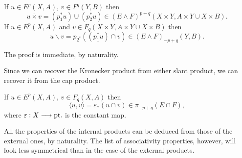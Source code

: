 \documentclass[../main]{subfiles}
\begin{document}
\begin{proposition}\label{prop:p3ch09.13}
If $u \in E^p(X, A)$, $v \in F^q(Y, B)$ then $$u \overline \times v = (p_1^\ast u) \cup (p_2^\ast u) \in (E \wedge F)^{p + q}(X \times Y, A \times Y \cup X \times B).$$ If $u \in E^p(X, A)$ and $v \in F_q(X \times Y, A \times Y \cup X \times B)$ then $$u \backslash v = p_{2^\ast} ((p_1^\ast u) \cap v) \in (E \wedge F)_{-p + q}(Y, B).$$ 
\end{proposition}

The proof is immediate, by naturality. 

Since we can recover the Kronecker product from either slant product, we can recover it from the cap product. 

\begin{proposition}\label{prop:p3ch09.14}
If $u \in E^p(X, A)$, $v \in F_q(X, A)$ then $$\langle u, v\rangle = \varepsilon_\ast (u \cap v) \in \pi_{-p + q}(E \cap F),$$ where $\varepsilon : X \overset{}{\longrightarrow} \mathrm{pt}.$ is the constant map. 
\end{proposition}

All the properties of the internal products can be deduced from those of the external ones, by naturality. The list of associativity properties, however, will look less symmetrical than in the case of the external products.
\end{document}
